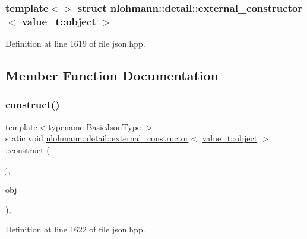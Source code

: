 \subsubsection*{template$<$$>$\newline
struct nlohmann\+::detail\+::external\+\_\+constructor$<$ value\+\_\+t\+::object $>$}



Definition at line 1619 of file json.\+hpp.



\subsection{Member Function Documentation}
\mbox{\label{structnlohmann_1_1detail_1_1external__constructor_3_01value__t_1_1object_01_4_a3a369c5d49596dd4411e368425f9ac7a}} 
\subsubsection{\texorpdfstring{construct()}{construct()}\hspace{0.1cm}{\footnotesize\ttfamily [1/3]}}
{\footnotesize\ttfamily template$<$typename Basic\+Json\+Type $>$ \\
static void \hyperlink{structnlohmann_1_1detail_1_1external__constructor}{nlohmann\+::detail\+::external\+\_\+constructor}$<$ \hyperlink{namespacenlohmann_1_1detail_a1ed8fc6239da25abcaf681d30ace4985aa8cfde6331bd59eb2ac96f8911c4b666}{value\+\_\+t\+::object} $>$\+::construct (\begin{DoxyParamCaption}\item[{Basic\+Json\+Type \&}]{j,  }\item[{const typename Basic\+Json\+Type\+::object\+\_\+t \&}]{obj }\end{DoxyParamCaption})\hspace{0.3cm}{\ttfamily [inline]}, {\ttfamily [static]}}



Definition at line 1622 of file json.\+hpp.

